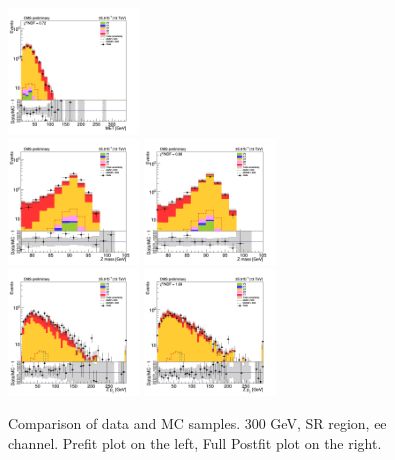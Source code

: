 \begin{figure}[tbp]
\begin{center}
    \includegraphics[width=0.31\textwidth]{figures/ee_300_SR_april21/met_pt_ee_SR_FullPostfit_plot_apr21.png}\\
    \includegraphics[width=0.31\textwidth]{figures/ee_300_SR_april21/zmass_ee_SR_prefit_plot_apr21.png}
    \includegraphics[width=0.31\textwidth]{figures/ee_300_SR_april21/zmass_ee_SR_FullPostfit_plot_apr21.png}\\
    \includegraphics[width=0.31\textwidth]{figures/ee_300_SR_april21/zpt0_ee_SR_prefit_plot_apr21.png}
    \includegraphics[width=0.31\textwidth]{figures/ee_300_SR_april21/zpt0_ee_SR_FullPostfit_plot_apr21.png}\\
    \caption{Comparison of data and MC samples. 300 GeV, SR region, ee channel. Prefit plot on the left,           Full Postfit plot on the right.}
    \label{fig:MCcomparisons_ee_low_SR_2}
  \end{center}
\end{figure}


